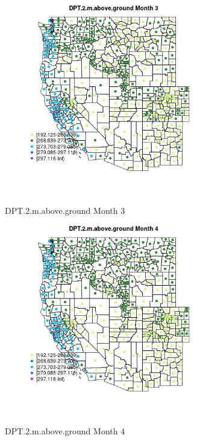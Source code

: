 \begin{figure} 
\centering  
\includegraphics[width=0.77\textwidth]{Code_Outputs/df_report_ML_predictors_CountyCentroid_Locations_Dates_2008-01-01to2018-12-31_MapObsMo3DPT2maboveground.jpg} 
\caption{\label{fig:df_report_ML_predictors_CountyCentroid_Locations_Dates_2008-01-01to2018-12-31MapObsMo3DPT2maboveground}DPT.2.m.above.ground Month 3} 
\end{figure} 
 

\begin{figure} 
\centering  
\includegraphics[width=0.77\textwidth]{Code_Outputs/df_report_ML_predictors_CountyCentroid_Locations_Dates_2008-01-01to2018-12-31_MapObsMo4DPT2maboveground.jpg} 
\caption{\label{fig:df_report_ML_predictors_CountyCentroid_Locations_Dates_2008-01-01to2018-12-31MapObsMo4DPT2maboveground}DPT.2.m.above.ground Month 4} 
\end{figure} 
 

